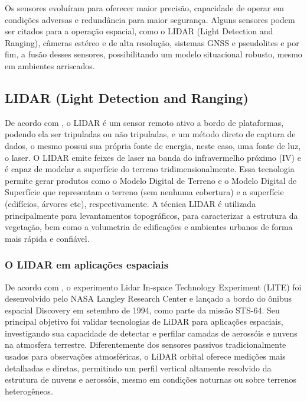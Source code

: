 Os sensores evoluíram para oferecer maior precisão, capacidade de operar em condições adversas e redundância para maior segurança. Alguns sensores podem ser citados para a operação espacial, como o LIDAR (Light Detection and Ranging), câmeras estéreo e de alta resolução, sistemas GNSS e pseudolites e por fim, a fusão desses sensores, possibilitando um modelo situacional robusto, mesmo em ambientes arriscados.

\subsection{LIDAR (Light Detection and Ranging)}

De acordo com \cite{inpeLidar}, o LIDAR é um sensor remoto ativo a bordo de plataformas, podendo ela ser tripuladas ou não tripuladas, e um método direto de captura de dados, o mesmo possui sua própria fonte de energia, neste caso, uma fonte de luz, o laser. O LIDAR emite feixes de laser na banda do infravermelho próximo (IV) e é capaz de modelar a superfície do terreno tridimensionalmente. Essa tecnologia permite gerar produtos como o Modelo Digital de Terreno e o Modelo Digital de Superfície que representam o terreno (sem nenhuma cobertura) e a superfície (edifícios, árvores etc), respectivamente. A técnica LIDAR é utilizada principalmente para levantamentos topográficos, para caracterizar a estrutura da vegetação, bem como a volumetria de edificações e ambientes urbanos de forma mais rápida e confiável.

\subsubsection{O LIDAR em aplicações espaciais}

De acordo com \cite{winker1996}, o experimento Lidar In-space Technology Experiment (LITE) foi desenvolvido pelo NASA Langley Research Center e lançado a bordo do ônibus espacial Discovery em setembro de 1994, como parte da missão STS-64. Seu principal objetivo foi validar tecnologias de LiDAR para aplicações espaciais, investigando sua capacidade de detectar e perfilar camadas de aerossóis e nuvens na atmosfera terrestre. Diferentemente dos sensores passivos tradicionalmente usados para observações atmosféricas, o LiDAR orbital oferece medições mais detalhadas e diretas, permitindo um perfil vertical altamente resolvido da estrutura de nuvens e aerossóis, mesmo em condições noturnas ou sobre terrenos heterogêneos.

